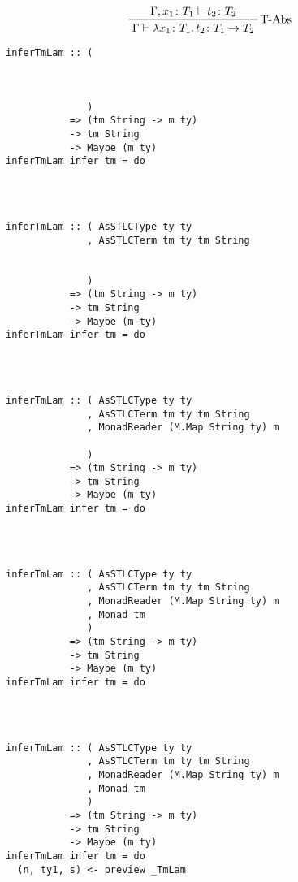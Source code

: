 \documentclass[aspectration=169]{beamer}
\begin{document}
\begin{frame}[fragile]
  \begin{displaymath}  
    \prftree[r]{T-Abs}
    {\Gamma, x_1 \colon T_1 \vdash t_2 \colon T_2}
    {\Gamma \vdash \lambda x_1 \colon T_1 \ldotp t_2 \colon T_1 \rightarrow T_2}
  \end{displaymath}  
  \begin{overprint}
  \begin{verbatim}
inferTmLam :: (



              )
           => (tm String -> m ty)
           -> tm String
           -> Maybe (m ty)
inferTmLam infer tm = do




  \end{verbatim}  
  \begin{verbatim}
inferTmLam :: ( AsSTLCType ty ty
              , AsSTLCTerm tm ty tm String


              )
           => (tm String -> m ty)
           -> tm String
           -> Maybe (m ty)
inferTmLam infer tm = do




  \end{verbatim}  
  \begin{verbatim}
inferTmLam :: ( AsSTLCType ty ty
              , AsSTLCTerm tm ty tm String
              , MonadReader (M.Map String ty) m

              )
           => (tm String -> m ty)
           -> tm String
           -> Maybe (m ty)
inferTmLam infer tm = do




  \end{verbatim}  
  \begin{verbatim}
inferTmLam :: ( AsSTLCType ty ty
              , AsSTLCTerm tm ty tm String
              , MonadReader (M.Map String ty) m
              , Monad tm
              )
           => (tm String -> m ty)
           -> tm String
           -> Maybe (m ty)
inferTmLam infer tm = do




  \end{verbatim}  
  \begin{verbatim}
inferTmLam :: ( AsSTLCType ty ty
              , AsSTLCTerm tm ty tm String
              , MonadReader (M.Map String ty) m
              , Monad tm
              )
           => (tm String -> m ty)
           -> tm String
           -> Maybe (m ty)
inferTmLam infer tm = do
  (n, ty1, s) <- preview _TmLam


\end{verbatim}
\end{overprint}
\end{frame}
\end{document}
